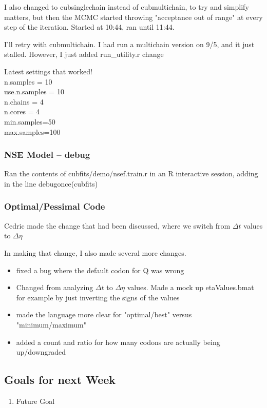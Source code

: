 \documentclass[11pt]{article} %
\begin{document}
I also changed to cubsinglechain instead of cubmultichain, to try and simplify matters, but then the MCMC started throwing "acceptance out of range" at every step of the iteration. Started at 10:44, ran until 11:44. 

I'll retry with cubmultichain. I had run a multichain version on 9/5, and it just stalled. However, I just added run\_utility.r change

Latest settings that worked!
\\n.samples = 10  
\\use.n.samples = 10
\\n.chains = 4
\\n.cores = 4
\\min.samples=50
\\max.samples=100



\subsubsection{NSE Model -- debug}

Ran the contents of cubfits/demo/nsef.train.r in an R interactive session, adding in the line debugonce(cubfits)


\subsubsection{Optimal/Pessimal Code}

Cedric made the change that had been discussed, where we switch from $\Delta t$ values to $\Delta\eta$

In making that change, I also made several more changes.

\begin{itemize}
\item fixed a bug where the default codon for Q was wrong
\item Changed from analyzing $\Delta t$ to $\Delta\eta$ values. Made a mock up etaValues.bmat for example by just inverting the signs of the values
\item made the language more clear for "optimal/best" versus "minimum/maximum"
\item added a count and ratio for how many codons are actually being up/downgraded
\end{itemize}



\subsection{Goals for next Week}
\begin{enumerate}
\item Future Goal
\end{enumerate}
\end{document}
